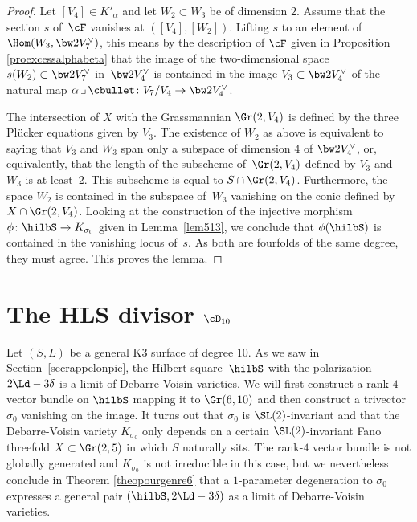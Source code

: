 \begin{proof} Let $[V_4]\in K'_\alpha$ and let $W_2\subset W_3$ be of dimension $2$.
Assume that the section $s$ of~$\cF$ vanishes at $([V_4],[W_2])$. Lifting $s$ to an element of $\Hom (W_3,\bw2V_7^\vee )$, this means by
the description of $\cF$ given in Proposition \ref{proexcessalphabeta} that the image of the two-dimensional space
$s(W_2)\subset \bw2V_7^\vee$ in~$\bw2V_4^\vee$ is contained in the image $V_3\subset \bw2V_4^\vee$ of
the natural map $\alpha\,\lrcorner\,\cbullet\colon V_7/V_4\to \bw2V_4^\vee$.

The intersection of $X$ with the Grassmannian $\Gr(2,V_4)$ is defined
by the three Plücker equations given by $V_3$. The existence of $W_2$ as above is equivalent to saying that $V_3$ and $W_3$ span only a subspace of dimension $4$ of $\bw2V_4^\vee$, or, equivalently, that the length of the subscheme of~$\Gr(2,V_4)$ defined by $V_3$ and $W_3$ is at least~$2$. This subscheme is equal to $S\cap \Gr(2,V_4)$. Furthermore, the space $W_2$ is contained in the subspace of~$W_3$ vanishing on the conic defined by $X\cap \Gr(2,V_4)$.
Looking at the construction of the injective morphism $\phi\colon \hilbS\to K_{\sigma_0}$ given in Lemma~\ref{lem513}, we conclude that $\phi(\hilbS)$ is contained in
the vanishing locus of~$s$. As both are fourfolds of the same degree, they must agree.
This proves the lemma.
\end{proof}

\section{The HLS divisor \texorpdfstring{$\cD_{10}$}{D10}}
\label{secpf6}

Let $(S,L)$ be a general K3 surface of degree $10$.
As we saw in Section~\ref{secrappelonpic}, the Hilbert square~$\hilbS$ with the polarization $2\Ld-3\delta$ is a limit of Debarre-Voisin varieties. We will first construct a
\mbox{rank-$4$} vector bundle on $\hilbS$ mapping it to $\Gr(6,10)$ and then construct a trivector
$\sigma_0$ vanishing on the image. It turns out that $\sigma_0$ is $\SL(2)$-invariant
and that the Debarre-Voisin variety $K_{\sigma_0}$ only depends on a certain
$\SL(2)$-invariant Fano threefold
$X\subset\Gr(2,5)$ in which $S$ naturally sits. The rank-$4$ vector bundle is not globally
generated and $K_{\sigma_0}$ is not irreducible in this case, but we nevertheless conclude in Theorem \ref{theopourgenre6} that a $1$-parameter degeneration to $\sigma_0$
expresses a general pair $(\hilbS,2\Ld-3\delta)$ as a limit of Debarre-Voisin varieties.

